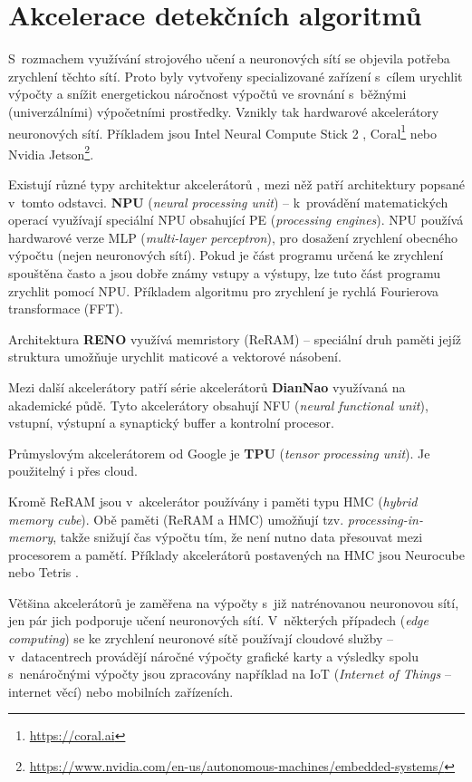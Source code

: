 \section{Akcelerace detekčních algoritmů}
\label{sekce:akcelerace}

S~rozmachem využívání strojového učení a neuronových sítí se objevila potřeba zrychlení těchto sítí. Proto byly vytvořeny specializované zařízení s~cílem urychlit výpočty a snížit energetickou náročnost výpočtů ve srovnání s~běžnými (univerzálními) výpočetními prostředky. Vznikly tak hardwarové akcelerátory neuronových sítí. Příkladem jsou Intel Neural Compute Stick 2 \cite{ncs2}, Coral\footnote{\url{https://coral.ai}} nebo Nvidia Jetson\footnote{\url{https://www.nvidia.com/en-us/autonomous-machines/embedded-systems/}}.

Existují různé typy architektur akcelerátorů \cite{acceleratorsSurvey}, mezi něž patří architektury popsané v~tomto odstavci.
\textbf{NPU} (\emph{neural processing unit}) -- k~provádění matematických operací využívají speciální NPU obsahující PE (\emph{processing engines}). NPU používá hardwarové verze MLP (\emph{multi-layer perceptron}), pro dosažení zrychlení obecného výpočtu (nejen neuronových sítí). Pokud je část programu určená ke zrychlení spouštěna často a jsou dobře známy vstupy a výstupy, lze tuto část programu zrychlit pomocí NPU. Příkladem algoritmu pro zrychlení je rychlá Fourierova transformace (FFT).

Architektura \textbf{RENO} využívá memristory (ReRAM) -- speciální druh paměti jejíž struktura umožňuje urychlit maticové a vektorové násobení.

Mezi další akcelerátory patří série akcelerátorů \textbf{DianNao} využívaná na akademické půdě. Tyto akcelerátory obsahují NFU (\emph{neural functional unit}), vstupní, výstupní a synaptický buffer a kontrolní procesor.

Průmyslovým akcelerátorem od Google je \textbf{TPU} (\emph{tensor processing unit}). Je použitelný i přes cloud.

Kromě ReRAM jsou v~akcelerátor používány i paměti typu HMC (\emph{hybrid memory cube}). Obě paměti (ReRAM a HMC) umožňují tzv. \emph{processing-in-memory}, takže snižují čas výpočtu tím, že není nutno data přesouvat mezi procesorem a pamětí. Příklady akcelerátorů postavených na HMC jsou Neurocube \cite{neurocube} nebo Tetris \cite{tetris}.

Většina akcelerátorů je zaměřena na výpočty s~již natrénovanou neuronovou sítí, jen pár jich podporuje učení neuronových sítí. V~některých případech (\emph{edge computing}) se ke zrychlení neuronové sítě používají cloudové služby -- v~datacentrech provádějí náročné výpočty grafické karty a výsledky spolu s~nenáročnými výpočty jsou zpracovány například na IoT (\emph{Internet of Things} -- internet věcí) nebo mobilních zařízeních.

